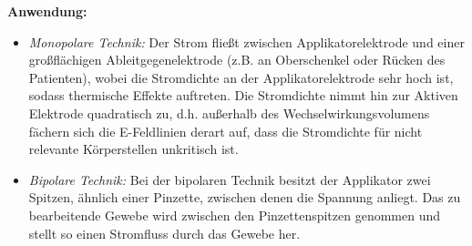 \documentclass[letterpaper,12pt]{article}
\begin{document}
		\textbf{Anwendung:}
		\begin{itemize}
			\item \emph{Monopolare Technik:} Der Strom fließt zwischen Applikatorelektrode und einer großflächigen Ableitgegenelektrode (z.B. an Oberschenkel oder Rücken des Patienten), wobei die Stromdichte an der Applikatorelektrode sehr hoch ist, sodass thermische Effekte auftreten. Die Stromdichte nimmt hin zur Aktiven Elektrode quadratisch zu, d.h. außerhalb des Wechselwirkungsvolumens fächern sich die E-Feldlinien derart auf, dass die Stromdichte für nicht relevante Körperstellen unkritisch ist.
			\item \emph{Bipolare Technik:} Bei der bipolaren Technik besitzt der Applikator zwei Spitzen, ähnlich einer Pinzette, zwischen denen die Spannung anliegt. Das zu bearbeitende Gewebe wird zwischen den Pinzettenspitzen genommen und stellt so einen Stromfluss durch das Gewebe her.
		\end{itemize}
				
\end{document}
